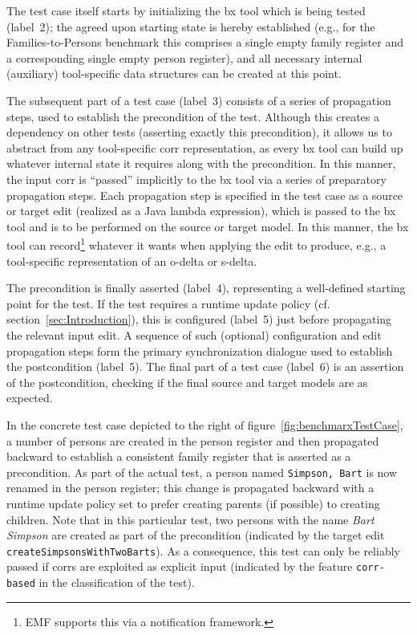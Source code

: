 The test case itself starts by initializing the bx tool which is being tested (label~2); the agreed upon starting state is hereby established (e.g., for the Families-to-Persons benchmark this comprises a single empty family register and a corresponding single empty person register), and all necessary internal (auxiliary) tool-specific data structures can be created at this point.


The subsequent part of a test case (label~3) consists of a series of propagation steps, used to establish the precondition of the test. 
Although this creates a dependency on other tests (asserting exactly this precondition), it allows us to abstract from any tool-specific corr representation, as every bx tool can build up whatever internal state it requires along with the precondition. 
In this manner, the input corr is ``passed'' implicitly to the bx tool via a series of preparatory propagation steps.
Each propagation step is specified in the test case as a source or target edit (realized as a Java lambda expression), which is passed to the bx tool and is to be performed on the source or target model.
In this manner, the bx tool can record\footnote{EMF supports this via a notification framework.} whatever it wants when applying the edit to produce, e.g., a tool-specific representation of an o-delta or s-delta.

The precondition is finally asserted (label~4), representing a well-defined starting point for the test. 
If the test requires a runtime update policy (cf. section~\ref{sec:Introduction}), this is configured (label~5) just before propagating the relevant input edit.
A sequence of such (optional) configuration and edit propagation steps form the primary synchronization dialogue used to establish the postcondition (label~5).
The final part of a test case (label~6) is an assertion of the postcondition, checking if the final source and target models are as expected. 



In the concrete test case depicted to the right of figure~\ref{fig:benchmarxTestCase}, a number of persons are created in the person register and then propagated backward to establish a consistent family register that is asserted as a precondition. 
As part of the actual test, a person named \texttt{Simpson, Bart} is now renamed in the person register; this change is propagated backward with a runtime update policy set to prefer creating parents (if possible) to creating children. 
Note that in this particular test, two persons with the name \emph{Bart Simpson} are created as part of the precondition (indicated by the target edit \texttt{createSimpsonsWithTwoBarts}). 
As a consequence, this test can only be reliably passed if corrs are exploited as explicit input (indicated by the feature \texttt{corr-based} in the classification of the test). 

